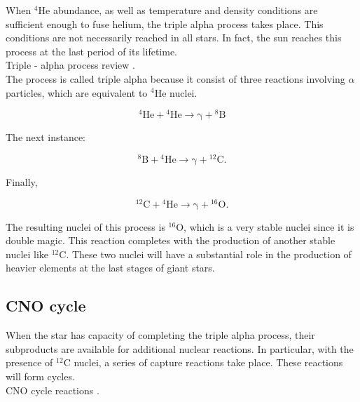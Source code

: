\documentclass[openany]{book}
\begin{document}
When $\mathrm{{}^{4}He}$ abundance, as well as temperature and density conditions are sufficient enough to fuse helium, the triple alpha process takes place. This conditions are not necessarily reached in all stars. In fact, the sun reaches this process at the last period of its lifetime.   \\

Triple - alpha process review \cite{coc_2012}. \\

The process is called triple alpha because it consist of three reactions involving $\alpha$ particles, which are equivalent to  $\mathrm{{}^{4}He}$ nuclei. 

\begin{equation}\label{eq:reaction_tripleAlpha_1}
	\mathrm{{}^{4}He + {}^{4}He \rightarrow  \gamma  + {}^{8}B }
\end{equation}

The next instance:

\begin{equation}\label{eq:reaction_tripleAlpha_2}
	\mathrm{{}^{8}B+ {}^{4}He \rightarrow  \gamma + {}^{12}C}. 
\end{equation}

Finally, 

\begin{equation}\label{eq:reaction_tripleAlpha_3}
	\mathrm{{}^{12}C + {}^{4}He \rightarrow \gamma + {}^{16}O}.
\end{equation}

The resulting nuclei of this process is $\mathrm{{}^{16}O}$, which is a very stable nuclei since it is double magic. This reaction completes with the production of another stable nuclei like $\mathrm{{}^{12}C}$. These two nuclei will have a substantial role in the production of heavier elements at the last stages of giant stars.

\subsection{CNO cycle}  \label{sub:CNOCycle}

When the star has capacity of completing the triple alpha process, their subproducts are available for additional nuclear reactions. In particular, with the presence of $\mathrm{{}^{12}C}$ nuclei, a series of capture reactions take place. These reactions will form cycles. \\

CNO cycle reactions \cite{wiescher_gorres_schatz_1999}. \\
\end{document}
